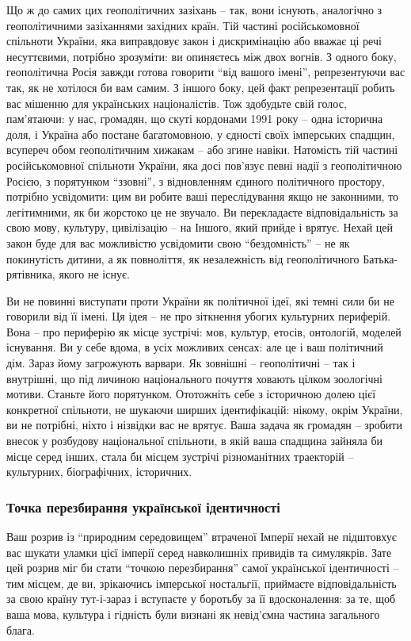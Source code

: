 Що ж до самих цих геополітичних зазіхань – так, вони існують, аналогічно з
геополітичними зазіханнями західних країн. Тій частині російськомовної
спільноти України, яка виправдовує закон і дискримінацію або вважає ці речі
несуттєвими, потрібно зрозуміти: ви опиняєтесь між двох вогнів. З одного боку,
геополітична Росія завжди готова говорити \enquote{від вашого імені}, репрезентуючи вас
так, як не хотілося би вам самим. З іншого боку, цей факт репрезентації робить
вас мішенню для українських націоналістів. Тож здобудьте свій голос,
пам'ятаючи: у нас, громадян, що скуті кордонами 1991 року – одна історична
доля, і Україна або постане багатомовною, у єдності своїх імперських спадщин,
всупереч обом геополітичним хижакам – або згине навіки. Натомість тій частині
російськомовної спільноти України, яка досі пов'язує певні надії з
геополітичною Росією, з порятунком \enquote{ззовні}, з відновленням єдиного політичного
простору, потрібно усвідомити: цим ви робите ваші переслідування якщо не
законними, то легітимними, як би жорстоко це не звучало. Ви перекладаєте
відповідальність за свою мову, культуру, цивілізацію – на Іншого, який прийде і
врятує. Нехай цей закон буде для вас можливістю усвідомити свою \enquote{бездомність} –
не як покинутість дитини, а як повноліття, як незалежність від геополітичного
Батька-рятівника, якого не існує. 

Ви не повинні виступати проти України як
політичної ідеї, які темні сили би не говорили від її імені. Ця ідея – не про
зіткнення убогих культурних периферій. Вона – про периферію як місце зустрічі:
мов, культур, етосів, онтологій, моделей існування. Ви у себе вдома, в усіх
можливих сенсах: але це і ваш політичний дім. Зараз йому загрожують варвари. Як
зовнішні – геополітичні – так і внутрішні, що під личиною національного почуття
ховають цілком зоологічні мотиви. Станьте його порятунком. Ототожніть себе з
історичною долею цієї конкретної спільноти, не шукаючи ширших ідентифікацій:
нікому, окрім України, ви не потрібні, ніхто і нізвідки вас не врятує. Ваша
задача як громадян – зробити внесок у розбудову національної спільноти, в якій
ваша спадщина зайняла би місце серед інших, стала би місцем зустрічі
різноманітних траекторій – культурних, біографічних, історичних. 

\subsubsection{Точка перезбирання української ідентичності}

Ваш розрив із \enquote{природним середовищем} втраченої Імперії нехай не
підштовхує вас шукати уламки цієї імперії серед навколишніх привидів та
симулякрів. Зате цей розрив міг би стати \enquote{точкою перезбирання} самої
української ідентичності – тим місцем, де ви, зрікаючись імперської ностальгії,
приймаєте відповідальність за свою країну тут-і-зараз і вступаєте у боротьбу за
її вдосконалення: за те, щоб ваша мова, культура і гідність були визнані як
невід'ємна частина загального блага.

